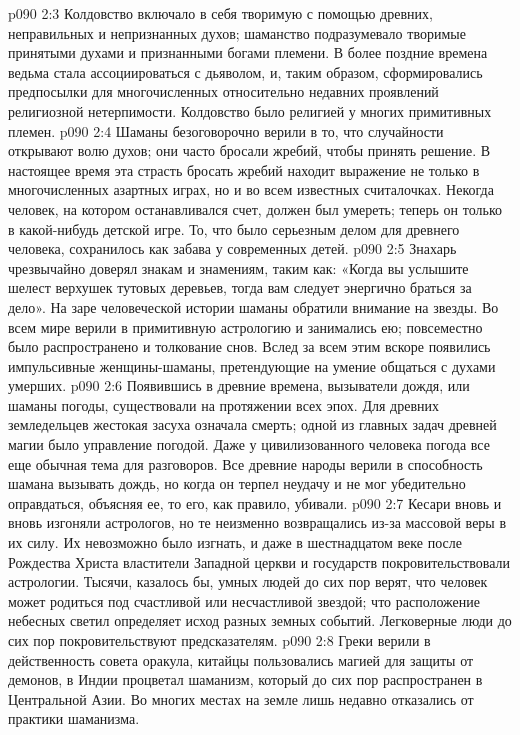 \vs p090 2:3 Колдовство включало в себя   творимую с помощью древних, неправильных и непризнанных духов; шаманство подразумевало  творимые принятыми духами и признанными богами племени. В более поздние времена ведьма стала ассоциироваться с дьяволом, и, таким образом, сформировались предпосылки для многочисленных относительно недавних проявлений религиозной нетерпимости. Колдовство было религией у многих примитивных племен.
\vs p090 2:4 Шаманы безоговорочно верили в то, что случайности открывают волю духов; они часто бросали жребий, чтобы принять решение. В настоящее время эта страсть бросать жребий находит выражение не только в многочисленных азартных играх, но и во всем известных считалочках. Некогда человек, на котором останавливался счет, должен был умереть; теперь он только  в какой\hyp{}нибудь детской игре. То, что было серьезным делом для древнего человека, сохранилось как забава у современных детей.
\vs p090 2:5 Знахарь чрезвычайно доверял знакам и знамениям, таким как: «Когда вы услышите шелест верхушек тутовых деревьев, тогда вам следует энергично браться за дело». На заре человеческой истории шаманы обратили внимание на звезды. Во всем мире верили в примитивную астрологию и занимались ею; повсеместно было распространено и толкование снов. Вслед за всем этим вскоре появились импульсивные женщины\hyp{}шаманы, претендующие на умение общаться с духами умерших.
\vs p090 2:6 Появившись в древние времена, вызыватели дождя, или шаманы погоды, существовали на протяжении всех эпох. Для древних земледельцев жестокая засуха означала смерть; одной из главных задач древней магии было управление погодой. Даже у цивилизованного человека погода все еще обычная тема для разговоров. Все древние народы верили в способность шамана вызывать дождь, но когда он терпел неудачу и не мог убедительно оправдаться, объясняя ее, то его, как правило, убивали.
\vs p090 2:7 Кесари вновь и вновь изгоняли астрологов, но те неизменно возвращались из\hyp{}за массовой веры в их силу. Их невозможно было изгнать, и даже в шестнадцатом веке после Рождества Христа властители Западной церкви и государств покровительствовали астрологии. Тысячи, казалось бы, умных людей до сих пор верят, что человек может родиться под счастливой или несчастливой звездой; что расположение небесных светил определяет исход разных земных событий. Легковерные люди до сих пор покровительствуют предсказателям.
\vs p090 2:8 Греки верили в действенность совета оракула, китайцы пользовались магией для защиты от демонов, в Индии процветал шаманизм, который до сих пор распространен в Центральной Азии. Во многих местах на земле лишь недавно отказались от практики шаманизма.
